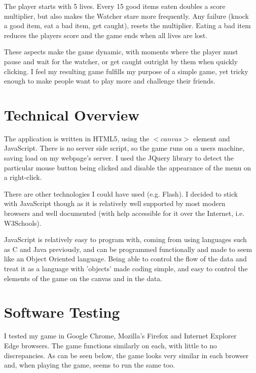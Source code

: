\documentclass{article}
\begin{document}
The player starts with 5 lives. Every 15 good items eaten doubles a score multiplier, but also makes the Watcher stare more frequently. Any failure (knock a good item, eat a bad item, get caught), resets the multiplier. Eating a bad item reduces the players score and the game ends when all lives are lost.

These aspects make the game dynamic, with moments where the player must pause and wait for the watcher, or get caught outright by them when quickly clicking. I feel my resulting game fulfills my purpose of a simple game, yet tricky enough to make people want to play more and challenge their friends.


\section{Technical Overview}
The application is written in HTML5, using the \begin{math}<canvas>\end{math} element and JavaScript. There is no server side script, so the game runs on a users machine, saving load on my webpage's server. I used the JQuery library to detect the particular mouse button being clicked and disable the appearance of the menu on a right-click.

There are other technologies I could have used (e.g. Flash). I decided to stick with JavaScript though as it is relatively well supported by most modern browsers and well documented (with help accessible for it over the Internet, i.e. W3Schools\cite{w3c}).

JavaScript is relatively easy to program with, coming from using languages such as C and Java previously, and can be programmed functionally and made to seem like an Object Oriented language. Being able to control the flow of the data and treat it as a language with 'objects' made coding simple, and easy to control the elements of the game on the canvas and in the data.


\section{Software Testing}
I tested my game in Google Chrome, Mozilla's Firefox and Internet Explorer Edge browsers. The game functions similarly on each, with little to no discrepancies. As can be seen below, the game looks very similar in each browser and, when playing the game, seems to run the same too.
\end{document}
